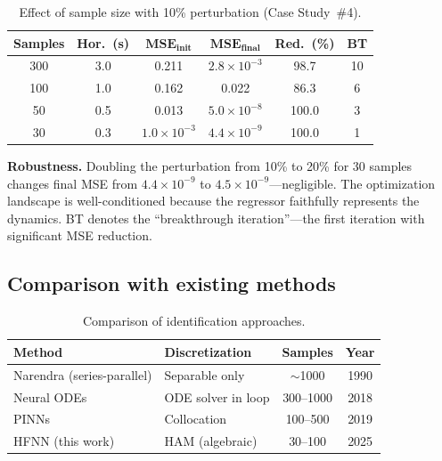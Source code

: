 \documentclass[preprint,12pt]{elsarticle}
\begin{document}
\begin{table}[h]
\centering
\caption{Effect of sample size with 10\% perturbation (Case Study~\#4).}
\label{tab:duffing_10}
\begin{tabular}{@{}cccccc@{}}
\toprule
\textbf{Samples} & \textbf{Hor.\ (s)} & $\mathbf{MSE_{init}}$ & $\mathbf{MSE_{final}}$ & \textbf{Red.\ (\%)} & \textbf{BT} \\
\midrule
300 & 3.0 & 0.211             & $2.8\times10^{-3}$ & 98.7  & 10 \\
100 & 1.0 & 0.162             & 0.022              & 86.3  & 6 \\
50  & 0.5 & 0.013             & $5.0\times10^{-8}$ & 100.0 & 3 \\
30  & 0.3 & $1.0\times10^{-3}$ & $4.4\times10^{-9}$ & 100.0 & 1 \\
\bottomrule
\end{tabular}
\end{table}

\textbf{Robustness.} Doubling the perturbation from 10\% to 20\% for 30 samples changes final MSE from $4.4\times10^{-9}$ to $4.5\times10^{-9}$---negligible. The optimization landscape is well-conditioned because the regressor faithfully represents the dynamics. BT denotes the ``breakthrough iteration''---the first iteration with significant MSE reduction.

\subsection{Comparison with existing methods}
\label{sec:comparison}

\begin{table}[h]
\centering
\caption{Comparison of identification approaches.}
\label{tab:comparison}
\begin{tabular}{@{}llcc@{}}
\toprule
\textbf{Method} & \textbf{Discretization} & \textbf{Samples} & \textbf{Year} \\
\midrule
Narendra (series-parallel) & Separable only       & $\sim$1000 & 1990 \\
Neural ODEs                & ODE solver in loop   & 300--1000  & 2018 \\
PINNs                      & Collocation          & 100--500   & 2019 \\
HFNN (this work)           & HAM (algebraic)      & 30--100    & 2025 \\
\bottomrule
\end{tabular}
\end{table}
\end{document}
